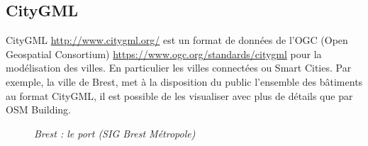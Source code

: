 \subsection{CityGML}

CityGML \href{http://www.citygml.org/}{http://www.citygml.org/} est un format de données de l'OGC (Open Geospatial Consortium)
 \href{https://www.ogc.org/standards/citygml}{https://www.ogc.org/standards/citygml} pour la modélisation des villes. En particulier les villes connectées ou Smart Cities. Par exemple, la ville de Brest, met à la disposition du public l'ensemble des bâtiments au format CityGML, il est possible de les visualiser avec plus de détails que par OSM Building.
\begin{center}
\begin{figure}[ht]
\caption{\label{equiProj}\textit{Brest : le port (SIG Brest Métropole)}}
\end{figure}
\end{center}
